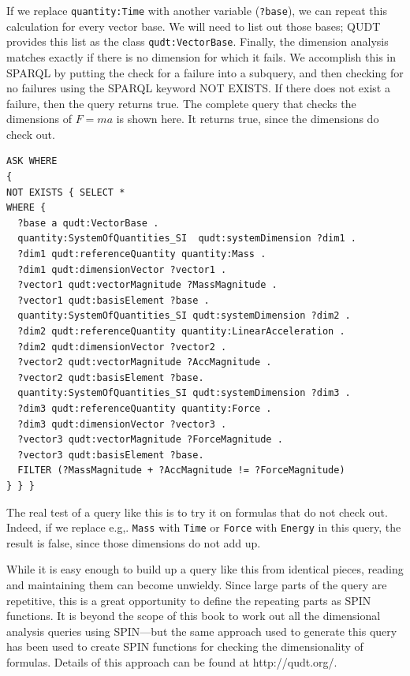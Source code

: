 If we replace \texttt{quantity:Time} with another variable (\texttt{?base}), we can repeat
this calculation for every vector base. We will need to list out those
bases; QUDT provides this list as the class \texttt{qudt:VectorBase}. Finally,
the dimension analysis matches exactly if there is no dimension for
which it fails. We accomplish this in SPARQL by putting the check for a
failure into a subquery, and then checking for no failures using the
SPARQL keyword NOT EXISTS. If there does not exist a failure, then the
query returns true. The complete query that checks the dimensions of $F = ma$ is shown here. It returns true, since the dimensions do check out.

\begin{lstlisting}
ASK WHERE
{
NOT EXISTS { SELECT *
WHERE { 
  ?base a qudt:VectorBase .
  quantity:SystemOfQuantities_SI  qudt:systemDimension ?dim1 .
  ?dim1 qudt:referenceQuantity quantity:Mass .
  ?dim1 qudt:dimensionVector ?vector1 .
  ?vector1 qudt:vectorMagnitude ?MassMagnitude .
  ?vector1 qudt:basisElement ?base .
  quantity:SystemOfQuantities_SI qudt:systemDimension ?dim2 .
  ?dim2 qudt:referenceQuantity quantity:LinearAcceleration .
  ?dim2 qudt:dimensionVector ?vector2 .
  ?vector2 qudt:vectorMagnitude ?AccMagnitude .
  ?vector2 qudt:basisElement ?base.
  quantity:SystemOfQuantities_SI qudt:systemDimension ?dim3 .
  ?dim3 qudt:referenceQuantity quantity:Force .
  ?dim3 qudt:dimensionVector ?vector3 .
  ?vector3 qudt:vectorMagnitude ?ForceMagnitude .
  ?vector3 qudt:basisElement ?base.
  FILTER (?MassMagnitude + ?AccMagnitude != ?ForceMagnitude)
} } }
\end{lstlisting}

The real test of a query like this is to try it on formulas that do not
check out. Indeed, if we replace e.g,. \texttt{Mass} with \texttt{Time} or \texttt{Force} with
\texttt{Energy} in this query, the result is false, since those dimensions do not
add up.

While it is easy enough to build up a query like this from identical
pieces, reading and maintaining them can become unwieldy. Since large
parts of the query are repetitive, this is a great opportunity to define
the repeating parts as SPIN functions. It is beyond the scope of this
book to work out all the dimensional analysis queries using SPIN---but
the same approach used to generate this query has been used to create
SPIN functions for checking the dimensionality of formulas. Details of
this approach can be found at http://qudt.org/.

